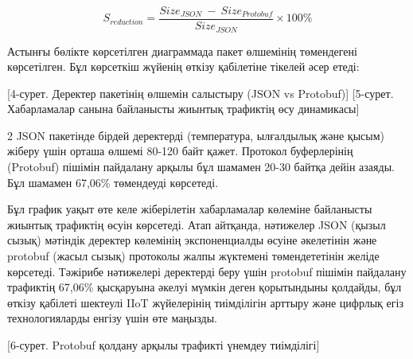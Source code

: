 \begin{equation}
S_{reduction} = \frac{{Size}_{JSON}\  - \ {Size}_{Protobuf}}{{Size}_{JSON}} \times 100\%
\end{equation}

Астынғы бөлікте көрсетілген диаграммада пакет өлшемінің төмендегені
көрсетілген. Бұл көрсеткіш жүйенің өткізу қабілетіне тікелей әсер етеді:

\begin{figs}
    [4-сурет. Деректер пакетінің өлшемін салыстыру (JSON vs Protobuf)]
    [5-сурет. Хабарламалар санына байланысты жиынтық трафиктің өсу динамикасы]
\end{figs}

\begin{multicols}{2}
JSON пакетінде бірдей деректерді (температура, ылғалдылық және қысым)
жіберу үшін орташа өлшемі 80-120 байт қажет. Протокол буферлерінің
(Protobuf) пішімін пайдалану арқылы бұл шамамен 20-30 байтқа дейін
азаяды. Бұл шамамен 67,06\% төмендеуді көрсетеді.

Бұл график уақыт өте келе жіберілетін хабарламалар көлеміне байланысты
жиынтық трафиктің өсуін көрсетеді. Атап айтқанда, нәтижелер JSON (қызыл
сызық) мәтіндік деректер көлемінің экспоненциалды өсуіне әкелетінін және
protobuf (жасыл сызық) протоколы жалпы жүктемені төмендететінін желіде
көрсетеді. Тәжірибе нәтижелері деректерді беру үшін protobuf пішімін
пайдалану трафиктің 67,06\% қысқаруына әкелуі мүмкін деген қорытындыны
қолдайды, бұл өткізу қабілеті шектеулі IIoT жүйелерінің тиімділігін
арттыру және цифрлық егіз технологияларды енгізу үшін өте маңызды.
\end{multicols}

[6-сурет. Protobuf қолдану арқылы трафикті үнемдеу тиімділігі]

